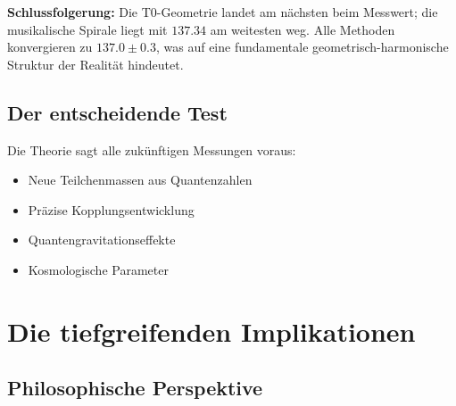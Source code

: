 	\begin{table}[h]
		\centering
		\caption{Detailanalyse der verschiedenen Ansätze}
	\end{table}
	
	\textbf{Schlussfolgerung:} Die T0-Geometrie landet am nächsten beim Messwert; die musikalische Spirale liegt mit $137.34$ am weitesten weg. Alle Methoden konvergieren zu $137.0 \pm 0.3$, was auf eine fundamentale geometrisch-harmonische Struktur der Realität hindeutet.
	
	\subsection{Der entscheidende Test}
	
	Die Theorie sagt alle zukünftigen Messungen voraus:
	\begin{itemize}
		\item Neue Teilchenmassen aus Quantenzahlen
		\item Präzise Kopplungsentwicklung
		\item Quantengravitationseffekte
		\item Kosmologische Parameter
	\end{itemize}
	
	\section{Die tiefgreifenden Implikationen}
	
	\subsection{Philosophische Perspektive}
	
